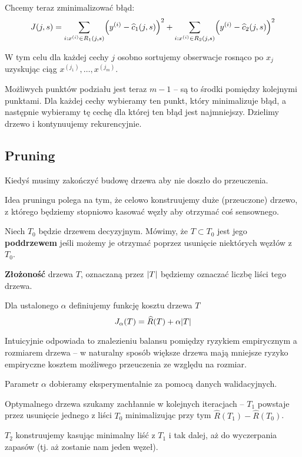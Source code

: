 Chcemy teraz zminimalizować błąd:
\[
    J(j, s) = 
        \sum_{i : x^{(i)} \in R_1(j, s)}\pars{y^{(i)} - \widehat c_1(j, s)}^2
        +
        \sum_{i : x^{(i)} \in R_2(j, s)}\pars{y^{(i)} - \widehat c_2(j, s)}^2
\]

W tym celu dla każdej cechy \( j \) osobno sortujemy obserwacje rosnąco po \( x_j \) uzyskując ciąg \( x^{(j_1)}, \dots, x^{(j_m)} \).

Możliwych punktów podziału jest teraz \( m - 1 \) -- są to środki pomiędzy kolejnymi punktami.
Dla każdej cechy wybieramy ten punkt, który minimalizuje błąd, a następnie wybieramy tę cechę dla której ten błąd jest najmniejszy.
Dzielimy drzewo i kontynuujemy rekurencyjnie.

\subsection{Pruning}
Kiedyś musimy zakończyć budowę drzewa aby nie doszło do przeuczenia.

Idea pruningu polega na tym, że celowo konstruujemy duże (przeuczone) drzewo, z którego będziemy stopniowo kasować węzły aby otrzymać coś sensownego.

\begin{definition}
    Niech \( T_0 \) będzie drzewem decyzyjnym.
    Mówimy, że \( T \subset T_0 \) jest jego \textbf{poddrzewem} jeśli możemy je otrzymać poprzez usunięcie niektórych węzłów z \( T_0 \).
\end{definition}
\begin{definition}
    \textbf{Złożoność} drzewa \( T \), oznaczaną przez \( \card{T} \) będziemy oznaczać liczbę liści tego drzewa.
\end{definition}

Dla ustalonego \( \alpha \) definiujemy funkcję kosztu drzewa \( T \)
\[
    J_\alpha(T) = \widehat R(T) + \alpha \card{T}
\]

Intuicyjnie odpowiada to znalezieniu balansu pomiędzy ryzykiem empirycznym a rozmiarem drzewa -- w naturalny sposób większe drzewa mają mniejsze ryzyko empiryczne kosztem możliwego przeuczenia ze względu na rozmiar.

Parametr \( \alpha \) dobieramy eksperymentalnie za pomocą danych walidacyjnych.

Optymalnego drzewa szukamy zachłannie w kolejnych iteracjach -- \( T_1 \) powstaje przez usunięcie jednego z liści \( T_0 \) minimalizując przy tym \( \widehat R(T_1) - \widehat R(T_0) \).

\( T_2 \) konstruujemy kasując minimalny liść z \( T_1 \) i tak dalej, aż do wyczerpania zapasów (tj. aż zostanie nam jeden węzeł).

